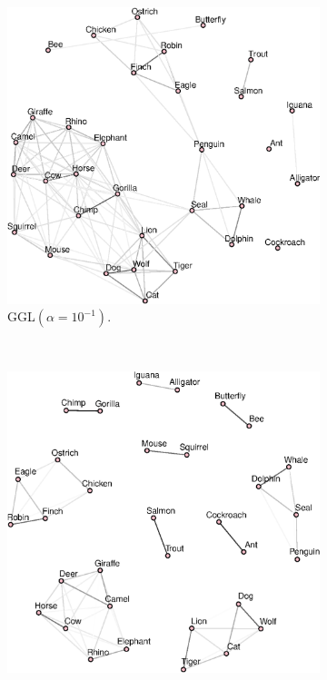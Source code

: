 \begin{figure}[!htb]
    \centering
    \begin{subfigure}[b]{0.475\textwidth}
      \includegraphics[width=\textwidth]{animals/latex/figures/animals_graph_ggl_alpha01.eps}
      \caption{\textsf{GGL}$(\alpha = 10^{-1})$.}
    \end{subfigure}
    ~
    \begin{subfigure}[b]{0.475\textwidth}
      \includegraphics[width=\textwidth]{animals/latex/figures/animals_graph_k10.eps}

\end{subfigure}
\end{figure}
